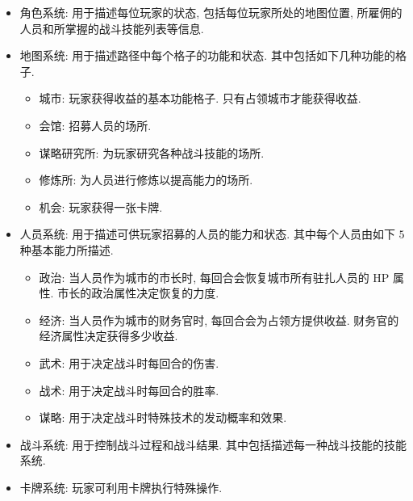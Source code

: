 \documentclass[UTF8, zihao=-4]{ctexart} %
\begin{document}
\begin{itemize}
    \item 角色系统: 用于描述每位玩家的状态, 包括每位玩家所处的地图位置, 所雇佣的人员和所掌握的战斗技能列表等信息.
    \item 地图系统: 用于描述路径中每个格子的功能和状态. 其中包括如下几种功能的格子.
        \begin{itemize}
            \item 城市: 玩家获得收益的基本功能格子. 只有占领城市才能获得收益.
            \item 会馆: 招募人员的场所.
            \item 谋略研究所: 为玩家研究各种战斗技能的场所.
            \item 修炼所: 为人员进行修炼以提高能力的场所.
            \item 机会: 玩家获得一张卡牌.
        \end{itemize}
    \item 人员系统: 用于描述可供玩家招募的人员的能力和状态. 其中每个人员由如下 $5$ 种基本能力所描述.
        \begin{itemize}
            \item 政治: 当人员作为城市的市长时, 每回合会恢复城市所有驻扎人员的 HP 属性. 市长的政治属性决定恢复的力度.
            \item 经济: 当人员作为城市的财务官时, 每回合会为占领方提供收益. 财务官的经济属性决定获得多少收益.
            \item 武术: 用于决定战斗时每回合的伤害.
            \item 战术: 用于决定战斗时每回合的胜率.
            \item 谋略: 用于决定战斗时特殊技术的发动概率和效果.
        \end{itemize}
    \item 战斗系统: 用于控制战斗过程和战斗结果. 其中包括描述每一种战斗技能的技能系统.
    \item 卡牌系统: 玩家可利用卡牌执行特殊操作.
\end{itemize}
\end{document}
